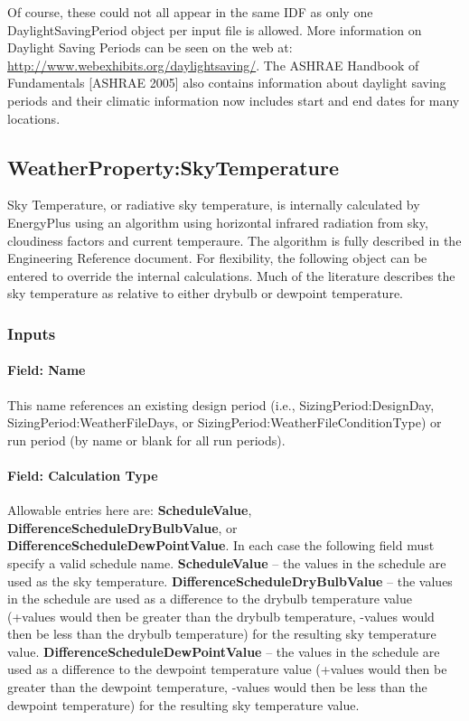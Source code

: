 Of course, these could not all appear in the same IDF as only one DaylightSavingPeriod object per input file is allowed. More information on Daylight Saving Periods can be seen on the web at: \url{http://www.webexhibits.org/daylightsaving/}. The ASHRAE Handbook of Fundamentals {[}ASHRAE 2005{]} also contains information about daylight saving periods and their climatic information now includes start and end dates for many locations.

\subsection{WeatherProperty:SkyTemperature}\label{weatherpropertyskytemperature}

Sky Temperature, or radiative sky temperature, is internally calculated by EnergyPlus using an algorithm using horizontal infrared radiation from sky, cloudiness factors and current temperaure. The algorithm is fully described in the Engineering Reference document. For flexibility, the following object can be entered to override the internal calculations. Much of the literature describes the sky temperature as relative to either drybulb or dewpoint temperature.

\subsubsection{Inputs}\label{inputs-8-011}

\paragraph{Field: Name}\label{field-name-7-009}

This name references an existing design period (i.e., SizingPeriod:DesignDay, SizingPeriod:WeatherFileDays, or SizingPeriod:WeatherFileConditionType) or run period (by name or blank for all run periods).

\paragraph{Field: Calculation Type}\label{field-calculation-type}

Allowable entries here are: \textbf{ScheduleValue}, \textbf{DifferenceScheduleDryBulbValue}, or \textbf{DifferenceScheduleDewPointValue}. In each case the following field must specify a valid schedule name. \textbf{ScheduleValue} -- the values in the schedule are used as the sky temperature. \textbf{DifferenceScheduleDryBulbValue} -- the values in the schedule are used as a difference to the drybulb temperature value (+values would then be greater than the drybulb temperature, -values would then be less than the drybulb temperature) for the resulting sky temperature value. \textbf{DifferenceScheduleDewPointValue} -- the values in the schedule are used as a difference to the dewpoint temperature value (+values would then be greater than the dewpoint temperature, -values would then be less than the dewpoint temperature) for the resulting sky temperature value.

